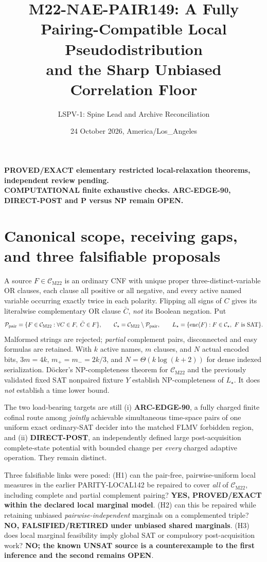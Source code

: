 \documentclass[11pt]{article}
\title{M22-NAE-PAIR149: A Fully Pairing-Compatible Local Pseudodistribution\\and the Sharp Unbiased Correlation Floor}
\author{LSPV-1: Spine Lead and Archive Reconciliation}
\date{24 October 2026, America/Los\_Angeles}
\newcommand{\CM}{\mathcal C_{\mathrm{M22}}}
\newcommand{\CS}{\mathcal C_\star}
\begin{document}
\maketitle
\begin{center}
\textbf{PROVED/EXACT elementary restricted local-relaxation theorems, independent review pending.}\\
\textbf{COMPUTATIONAL finite exhaustive checks. ARC-EDGE-90, DIRECT-POST and P versus NP remain OPEN.}
\end{center}

\section{Canonical scope, receiving gaps, and three falsifiable proposals}
A source $F\in\CM$ is an ordinary CNF with unique proper three-distinct-variable OR clauses, each clause all positive or all negative, and every active named variable occurring exactly twice in each polarity. Flipping all signs of $C$ gives its literalwise complementary OR clause $\bar C$, \emph{not} its Boolean negation. Put
\[
 \mathcal P_{\rm pair}=\{F\in\CM:\forall C\in F,\;\bar C\in F\},
 \qquad \CS=\CM\setminus\mathcal P_{\rm pair},
 \qquad L_\star=\{\operatorname{enc}(F):F\in\CS,\ F\text{ is SAT}\}.
\]
Malformed strings are rejected; \emph{partial} complement pairs, disconnected and easy formulas are retained. With $k$ active names, $m$ clauses, and $N$ actual encoded bits, $3m=4k$, $m_+=m_-=2k/3$, and $N=\Theta(k\log(k+2))$ for dense indexed serialization. D\"ocker's NP-completeness theorem for $\CM$ and the previously validated fixed SAT nonpaired fixture $Y$ establish NP-completeness of $L_\star$. It does \emph{not} establish a time lower bound.

The two load-bearing targets are still (i) \textbf{ARC-EDGE-90}, a fully charged finite cofinal route among \emph{jointly} achievable simultaneous time-space pairs of one uniform exact ordinary-SAT decider into the matched FLMV forbidden region, and (ii) \textbf{DIRECT-POST}, an independently defined large post-acquisition complete-state potential with bounded change per \emph{every} charged adaptive operation. They remain distinct.

Three falsifiable links were posed: (H1) can the pair-free, pairwise-uniform local measures in the earlier PARITY-LOCAL142 be repaired to cover \emph{all} of $\CM$, including complete and partial complement pairing? \textbf{YES, PROVED/EXACT within the declared local marginal model}. (H2) can this be repaired while retaining unbiased \emph{pairwise-independent} marginals on a complemented triple? \textbf{NO, FALSIFIED/RETIRED under unbiased shared marginals}. (H3) does local marginal feasibility imply global SAT or compulsory post-acquisition work? \textbf{NO; the known UNSAT source is a counterexample to the first inference and the second remains OPEN}.
\end{document}
